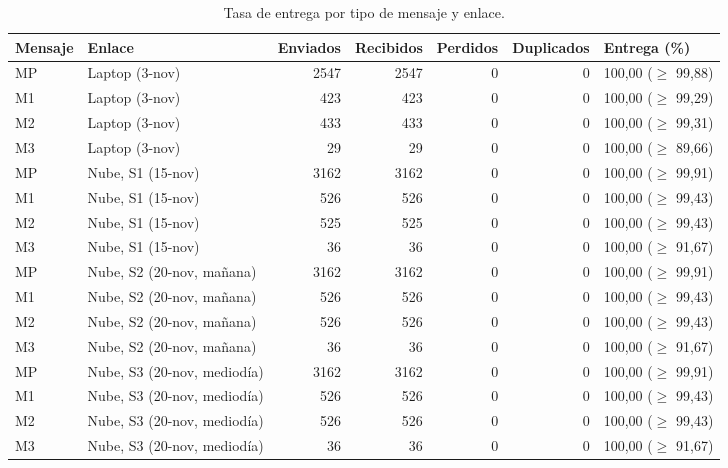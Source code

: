 \begin{table}[H]
\centering
\caption{Tasa de entrega por tipo de mensaje y enlace.}
\label{tab:entrega}
\small
\begin{tabular}{llrrrrl}
\toprule
\textbf{Mensaje} & \textbf{Enlace} & \textbf{Enviados} & \textbf{Recibidos} & \textbf{Perdidos} & \textbf{Duplicados} & \textbf{Entrega (\%)} \\
\midrule
MP & Laptop (3-nov) & 2547 & 2547 & 0 & 0 & 100,00 ($\geq$ 99,88) \\
M1 & Laptop (3-nov) & 423 & 423 & 0 & 0 & 100,00 ($\geq$ 99,29) \\
M2 & Laptop (3-nov) & 433 & 433 & 0 & 0 & 100,00 ($\geq$ 99,31) \\
M3 & Laptop (3-nov) & 29 & 29 & 0 & 0 & 100,00 ($\geq$ 89,66) \\
\addlinespace
MP & Nube, S1 (15-nov) & 3162 & 3162 & 0 & 0 & 100,00 ($\geq$ 99,91) \\
M1 & Nube, S1 (15-nov) & 526 & 526 & 0 & 0 & 100,00 ($\geq$ 99,43) \\
M2 & Nube, S1 (15-nov) & 525 & 525 & 0 & 0 & 100,00 ($\geq$ 99,43) \\
M3 & Nube, S1 (15-nov) & 36 & 36 & 0 & 0 & 100,00 ($\geq$ 91,67) \\
\addlinespace
MP & Nube, S2 (20-nov, mañana) & 3162 & 3162 & 0 & 0 & 100,00 ($\geq$ 99,91) \\
M1 & Nube, S2 (20-nov, mañana) & 526 & 526 & 0 & 0 & 100,00 ($\geq$ 99,43) \\
M2 & Nube, S2 (20-nov, mañana) & 526 & 526 & 0 & 0 & 100,00 ($\geq$ 99,43) \\
M3 & Nube, S2 (20-nov, mañana) & 36 & 36 & 0 & 0 & 100,00 ($\geq$ 91,67) \\
\addlinespace
MP & Nube, S3 (20-nov, mediodía) & 3162 & 3162 & 0 & 0 & 100,00 ($\geq$ 99,91) \\
M1 & Nube, S3 (20-nov, mediodía) & 526 & 526 & 0 & 0 & 100,00 ($\geq$ 99,43) \\
M2 & Nube, S3 (20-nov, mediodía) & 526 & 526 & 0 & 0 & 100,00 ($\geq$ 99,43) \\
M3 & Nube, S3 (20-nov, mediodía) & 36 & 36 & 0 & 0 & 100,00 ($\geq$ 91,67) \\
\bottomrule
\end{tabular}
\par{}
\end{table}
